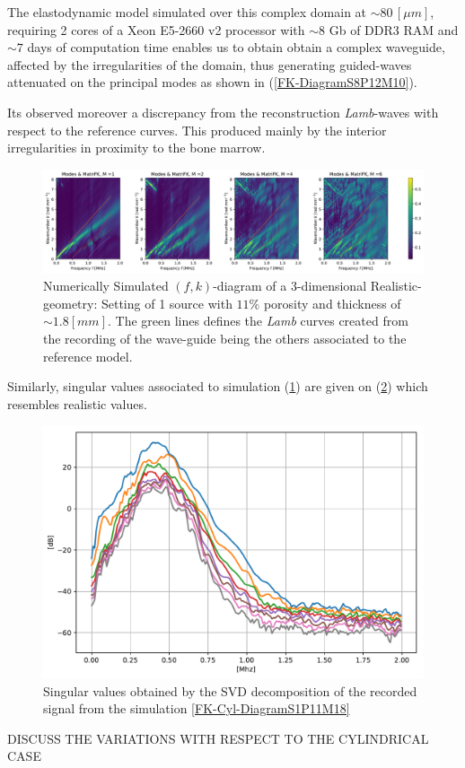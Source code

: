 \begin{rem}
The elastodynamic model simulated over this complex domain at $\sim 80 \, [\mu m]$, requiring 2 cores of a Xeon E5-2660 v2 processor with $\sim 8$ Gb of DDR3 RAM and $\sim 7$ days of computation time enables us to obtain obtain a complex waveguide, affected by the irregularities of the domain, thus generating guided-waves attenuated on the principal modes as shown in (\ref{FK-DiagramS8P12M10}).
\end{rem}

Its observed moreover a discrepancy from the reconstruction \textit{Lamb}-waves with respect to the reference curves. This produced mainly by the interior irregularities in proximity to the bone marrow.

\begin{figure}[!h]
	\centering
	\includegraphics[width=\textwidth]{images/ClusterSim/3DCorticalS1000TimeP11TransIsoFKW18.pdf}
	\caption{Numerically Simulated $(f,k)$-diagram of a 3-dimensional Realistic-geometry: Setting of 1 source with $11\%$ porosity and thickness of $\sim 1.8 [mm]$. The green lines defines the \textit{Lamb} curves created from the recording of the wave-guide being the others associated to the reference model.}
	\label{FK-HomBone-DiagramS1P11M18}
\end{figure} 

Similarly, singular values associated to simulation (\ref{FK-HomBone-DiagramS1P11M18}) are given on (\ref{SVD-HomBone-S1P11M18}) which resembles realistic values.
\begin{figure}[!h]  
	\centering
	\includegraphics[scale=.5]{images/ClusterSim/3DCorticalS1000TimeP11TransIsoFKW18_SV.pdf}
	\caption{Singular values obtained by the SVD decomposition of the recorded signal from the simulation \ref{FK-Cyl-DiagramS1P11M18}}
	\label{SVD-HomBone-S1P11M18}
\end{figure}
DISCUSS THE VARIATIONS WITH RESPECT TO THE CYLINDRICAL CASE


